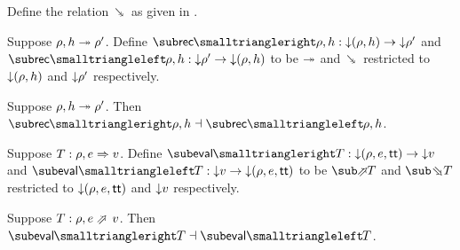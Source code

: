 \begin{definition}
   \label{def:core-language:closeDefs-bwd}
   Define the relation $\closeDefsBwdR$ as given in .
\end{definition}

\begin{definition}
   Suppose $\rho, h \twoheadrightarrow \rho'$. Define $\closeDefsFwdF{\rho,h}: \Below{(\rho, h)} \to \Below{\rho'}$ and $\closeDefsBwdF{\rho,h}: \Below{\rho'} \to \Below{(\rho, h)}$ to be $\twoheadrightarrow$ and $\closeDefsBwdR$ restricted to ${\downarrow}{(\rho, h)}$ and ${\downarrow}{\rho'}$ respectively.
\end{definition}

\begin{theorem}
\label{thm:core-language:closeDefs:gc}
   Suppose $\rho, h \twoheadrightarrow \rho'$.  Then $\closeDefsFwdF{\rho,h} \adjoint \closeDefsBwdF{\rho,h}$.
\end{theorem}

\begin{definition}
   Suppose $T: \rho, e \Rightarrow v$. Define $\evalFwdF{T}: \Below{(\rho, e, \TT)} \to \Below{v}$ and $\evalBwdF{T}: \Below{v} \to \Below{(\rho, e, \TT)}$ to be $\evalFwdR{T}$ and $\evalBwdR{T}$ restricted to ${\downarrow}{(\rho, e, \mathsf{tt})}$ and ${\downarrow}{v}$ respectively.
\end{definition}

\begin{theorem}
\label{thm:core-language:eval:gc}
   Suppose $T: \rho, e \evalFwdS v$.  Then $\evalFwdF{T} \adjoint \evalBwdF{T}$.
\end{theorem}
